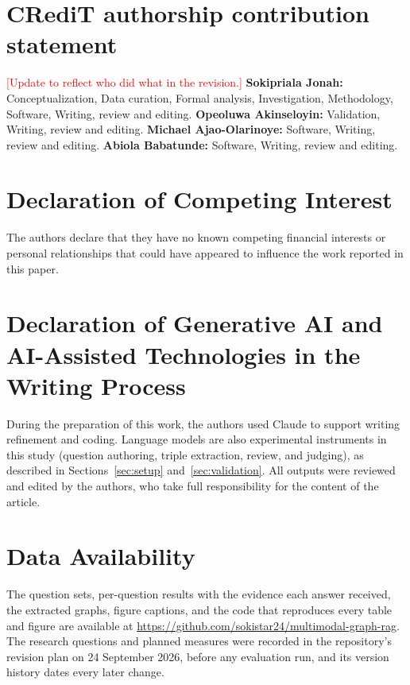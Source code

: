 \documentclass[preprint,12pt]{elsarticle}
\newcommand{\tbd}[1]{\textcolor{red}{[#1]}}
\begin{document}

\section*{CRediT authorship contribution statement}
\tbd{Update to reflect who did what in the revision.}
\textbf{Sokipriala Jonah:}
Conceptualization, Data curation, Formal analysis, Investigation,
Methodology, Software, Writing, review and editing.
\textbf{Opeoluwa Akinseloyin:}
Validation, Writing, review and editing.
\textbf{Michael Ajao-Olarinoye:}
Software, Writing, review and editing.
\textbf{Abiola Babatunde:}
Software, Writing, review and editing.

\section*{Declaration of Competing Interest}
The authors declare that they have no known competing financial interests
or personal relationships that could have appeared to influence the work
reported in this paper.

\section*{Declaration of Generative AI and AI-Assisted Technologies in the
Writing Process}
During the preparation of this work, the authors used Claude to support
writing refinement and coding. Language models are also experimental
instruments in this study (question authoring, triple extraction, review, and
judging), as described in Sections~\ref{sec:setup}
and~\ref{sec:validation}. All outputs were reviewed and edited by the authors,
who take full responsibility for the content of the article.

\section*{Data Availability}
The question sets, per-question results with the evidence each answer
received, the extracted graphs, figure captions, and the code that reproduces
every table and figure are available at
\url{https://github.com/sokistar24/multimodal-graph-rag}. The research
questions and planned measures were recorded in the repository's revision
plan on 24 September 2026, before any evaluation run, and its version history
dates every later change.
\end{document}
